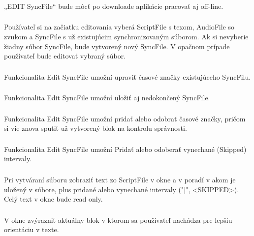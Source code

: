 \documentclass{article}
\begin{document}
\subsubsection{}
„EDIT SyncFile“ bude môcť po downloade aplikácie pracovať aj off-line.

\subsubsection{}
Používateľ si na začiatku editovania vyberá ScriptFile s texom, AudioFile so zvukom a SyncFile s už existujúcim synchronizovaným súborom. Ak si nevyberie žiadny súbor SyncFile, bude vytvorený nový SyncFile. V opačnom prípade používateľ bude editovať vybraný súbor. 

\subsubsection{}
Funkcionalita Edit SyncFile umožní upraviť časové značky existujúceho SyncFilu.

\subsubsection{}
Funkcionalita Edit SyncFile umožní uložiť aj nedokončený SyncFile.

\subsubsection{}
Funkcionalita Edit SyncFile umožní pridať alebo odobrať časové značky, pričom si vie znova sputiť už vytvorený blok na kontrolu správnosti. 

\subsubsection{}
Funkcionalita Edit SyncFile umožní Pridať alebo odoberať vynechané (Skipped) intervaly.

\subsubsection{}
Pri vytváraní súboru zobraziť text zo ScriptFile v okne a v poradí v akom je uložený v súbore, plus pridané alebo vynechané intervaly ("|", <SKIPPED>). Celý text v okne bude read only.

\subsubsection{}
V okne zvýrazniť aktuálny blok v ktorom sa používateľ nachádza pre lepšiu orientáciu v texte.
\end{document}
